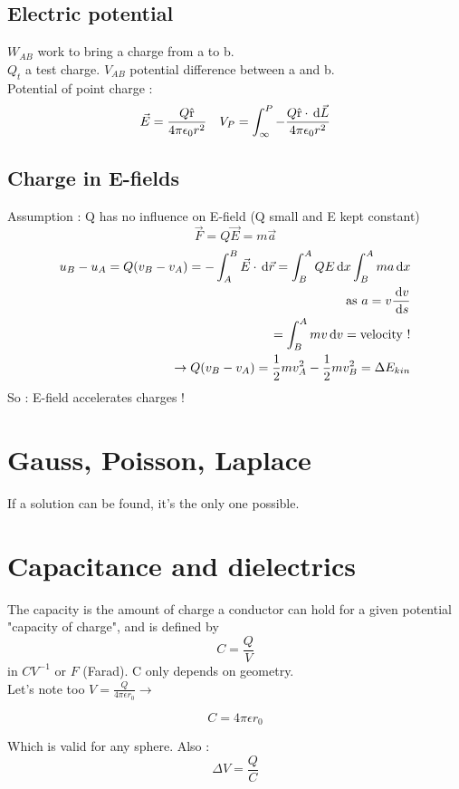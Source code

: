 \documentclass[12pt,a4paper]{article}
\begin{document}
\subsection{Electric potential}
$W_{AB}$ work to bring a charge from a to b.\\
$Q_t$ a test charge.
$V_{AB}$ potential difference between a and b.\\
Potential of point charge :
\[\vec{E} = \frac{Q\text{\^{r}}}{4\pi\epsilon_0 r^2} \quad V_P = \int_\infty^P -\frac{Q\text{\^{r}} \cdot\, \mathrm d \vec{L}}{4\pi\epsilon_0 r^2}\]

\subsection{Charge in E-fields}
Assumption : Q has no influence on E-field (Q small and E kept constant) 
\[\vec{F} = Q\vec{E} = m\vec{a}\]
\begin{align*}
	u_B - u_A = Q(v_B-v_A) = -\int_A^B \vec{E} \cdot \, \mathrm d \vec{r} = \int_B^A Q E \, \mathrm d x  \int_B^A ma\, \mathrm d x \\
	\text{as }a = v\frac{\, \mathrm d v}{\, \mathrm d s}\\
	= \int_B^A mv \, \mathrm d v = \text{velocity !}\\
	\to Q(v_B - v_A) = \frac{1}{2}mv_A^2 - \frac{1}{2}mv_B^2 = \Delta E_{kin}
\end{align*}
So : E-field accelerates charges !



\section{Gauss, Poisson, Laplace}
If a solution can be found, it's the only one possible.

\section{Capacitance and dielectrics}
\begin{boite}
	The capacity is the amount of charge a conductor can hold for a given potential "capacity of charge", and is defined by 
	\[C = \frac{Q}{V}\]
	in $CV^{-1}$ or $F$ (Farad). C only depends on geometry. \\
	Let's note too $V = \frac{Q}{4\pi \epsilon r_0} \to$
	\begin{boite}[0.3]
		\[C = 4\pi\epsilon r_0\]
	\end{boite}
	Which is valid for any sphere. Also :
	\[\Delta V = \frac{Q}{C}\]
\end{boite}
\end{document}
